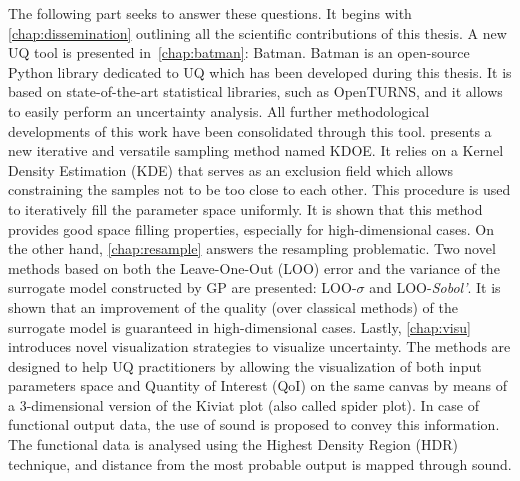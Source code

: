 The following part seeks to answer these questions. It begins with \cref{chap:dissemination} outlining all the scientific contributions of this thesis. A new UQ tool is presented in~\cref{chap:batman}: Batman. Batman is an open-source Python library dedicated to UQ which has been developed during this thesis. It is based on state-of-the-art statistical libraries, such as OpenTURNS, and it allows to easily perform an uncertainty analysis. All further methodological developments of this work have been consolidated through this tool.  presents a new iterative and versatile sampling method named KDOE. It relies on a Kernel Density Estimation (KDE) that serves as an exclusion field which allows constraining the samples not to be too close to each other. This procedure is used to iteratively fill the parameter space uniformly. It is shown that this method provides good space filling properties, especially for high-dimensional cases. On the other hand, \cref{chap:resample} answers the resampling problematic. Two novel methods based on both the Leave-One-Out (LOO) error and the variance of the surrogate model constructed by GP are presented: LOO-$\sigma$ and LOO-\emph{Sobol'}. It is shown that an improvement of the quality (over classical methods) of the surrogate model is guaranteed in high-dimensional cases. Lastly, \cref{chap:visu} introduces novel visualization strategies to visualize uncertainty. The methods are designed to help UQ practitioners by allowing the visualization of both input parameters space and  Quantity of Interest (QoI) on the same canvas by means of a 3-dimensional version of the Kiviat plot (also called spider plot). In case of functional output data, the use of sound is proposed to convey this information. The functional data is analysed using the Highest Density Region (HDR) technique, and distance from the most probable output is mapped through sound.
 
